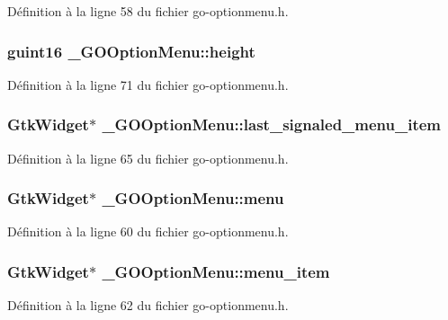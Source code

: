 Définition à la ligne 58 du fichier go-\/optionmenu.h.

\subsubsection[{height}]{\setlength{\rightskip}{0pt plus 5cm}guint16 {\bf \_\-GOOptionMenu::height}}\label{struct__GOOptionMenu_ace5a1b8c2a5c5f286f504b4995be0756}


Définition à la ligne 71 du fichier go-\/optionmenu.h.

\subsubsection[{last\_\-signaled\_\-menu\_\-item}]{\setlength{\rightskip}{0pt plus 5cm}GtkWidget$\ast$ {\bf \_\-GOOptionMenu::last\_\-signaled\_\-menu\_\-item}}\label{struct__GOOptionMenu_a9432723e231444928d123cda4eeaed4f}


Définition à la ligne 65 du fichier go-\/optionmenu.h.

\subsubsection[{menu}]{\setlength{\rightskip}{0pt plus 5cm}GtkWidget$\ast$ {\bf \_\-GOOptionMenu::menu}}\label{struct__GOOptionMenu_a83e57577706c6b876278acf75d86f23a}


Définition à la ligne 60 du fichier go-\/optionmenu.h.

\subsubsection[{menu\_\-item}]{\setlength{\rightskip}{0pt plus 5cm}GtkWidget$\ast$ {\bf \_\-GOOptionMenu::menu\_\-item}}\label{struct__GOOptionMenu_a3e67c1f448f5744922c570a941491201}


Définition à la ligne 62 du fichier go-\/optionmenu.h.

